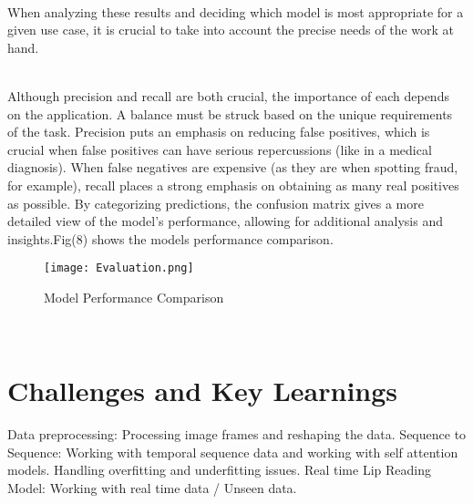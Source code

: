 \documentclass[conference]{IEEEtran}
\begin{document}
\\ When analyzing these results and deciding which model is most appropriate for a given use case, it is crucial to take into account the precise needs of the work at hand.

\\ Although precision and recall are both crucial, the importance of each depends on the application. A balance must be struck based on the unique requirements of the task.
Precision puts an emphasis on reducing false positives, which is crucial when false positives can have serious repercussions (like in a medical diagnosis).
When false negatives are expensive (as they are when spotting fraud, for example), recall places a strong emphasis on obtaining as many real positives as possible.
By categorizing predictions, the confusion matrix gives a more detailed view of the model's performance, allowing for additional analysis and insights.Fig(8) shows the models performance comparison.
\begin{figure}[htbp]
\centerline{\texttt{[image: Evaluation.png]}}
\caption{Model Performance Comparison}
\label{fig}
\end{figure}

\\ 


\section{Challenges and Key Learnings}
 Data preprocessing: Processing image frames and reshaping the data.
 Sequence to Sequence: Working with temporal sequence data and working with self attention models.
 Handling overfitting and underfitting issues.
 Real time Lip Reading Model: Working with real time data / Unseen data.
\end{document}
